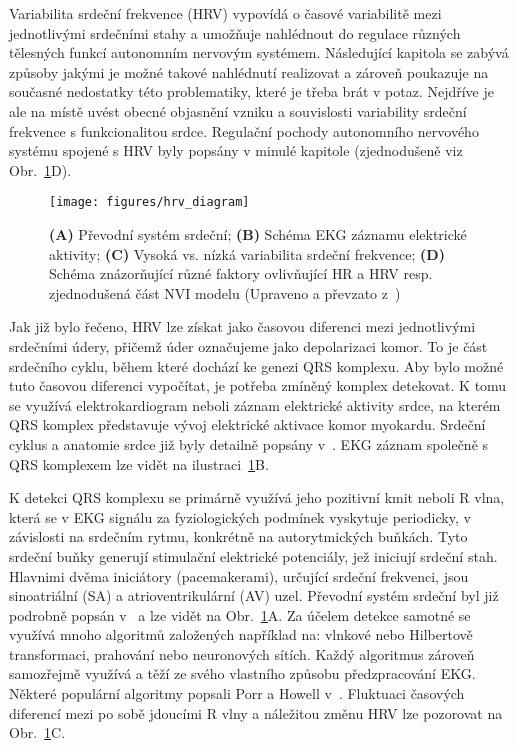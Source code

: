 Variabilita srdeční frekvence (\gls{HRV}) vypovídá o časové variabilitě mezi
jednotlivými srdečními stahy a umožňuje nahlédnout do regulace různých tělesných
funkcí autonomním nervovým systémem. Následující kapitola se zabývá způsoby
jakými je možné takové nahlédnutí realizovat a zároveň poukazuje na současné
nedostatky této problematiky, které je třeba brát v potaz. Nejdříve je ale na
místě uvést obecné objasnění vzniku a souvislosti variability srdeční frekvence
s funkcionalitou srdce. Regulační pochody autonomního nervového systému spojené
s \gls{HRV} byly popsány v minulé kapitole (zjednodušeně viz
Obr.~\ref{fig:hrv_diagram}D).

\begin{figure}[h]
    \begin{center}
        \texttt{[image: figures/hrv\_diagram]}
        \caption{\textbf{(A)} Převodní systém srdeční; \textbf{(B)} Schéma
            \gls{EKG} záznamu elektrické aktivity; \textbf{(C)} Vysoká vs. nízká
            variabilita srdeční frekvence; \textbf{(D)} Schéma znázorňující
            různé faktory ovlivňující \gls{HR} a \gls{HRV} resp. zjednodušená
            část \gls{NVI} modelu (Upraveno a převzato z~\cite{Lujan2021})}
        \label{fig:hrv_diagram}
    \end{center}
\end{figure}

Jak již bylo řečeno, \gls{HRV} lze získat jako časovou diferenci mezi jednotlivými
srdečními údery, přičemž úder označujeme jako depolarizaci komor. To je část
srdečního cyklu, během které dochází ke genezi QRS komplexu. Aby bylo možné tuto
časovou diferenci vypočítat, je potřeba zmíněný komplex detekovat. K tomu se
využívá elektrokardiogram neboli záznam elektrické aktivity srdce, na kterém QRS
komplex představuje vývoj elektrické aktivace komor myokardu. Srdeční cyklus a
anatomie srdce již byly detailně popsány v~\cite{Stejfa2006,Weinhaus2005,Cihak2016}.
EKG záznam společně s QRS komplexem lze vidět na ilustraci~\ref{fig:hrv_diagram}B.

K detekci QRS komplexu se primárně využívá jeho pozitivní kmit neboli R vlna,
která se v \gls{EKG} signálu za fyziologických podmínek vyskytuje periodicky, v
závislosti na srdečním rytmu, konkrétně na autorytmických buňkách. Tyto srdeční
buňky generují stimulační elektrické potenciály, jež iniciují srdeční stah.
Hlavnimi dvěma iniciátory (pacemakerami), určující srdeční frekvenci, jsou
sinoatriální (\gls{SA}) a atrioventrikulární (\gls{AV}) uzel. Převodní systém
srdeční byl již podrobně popsán v~\cite{Stejfa2006,Weinhaus2005,Goldberger2017}
a lze vidět na Obr.~\ref{fig:hrv_diagram}A. Za účelem detekce samotné se využívá
mnoho algoritmů založených například na: vlnkové nebo Hilbertově transformaci,
prahování nebo neuronových sítích. Každý algoritmus zároveň samozřejmě využívá a
těží ze svého vlastního způsobu předzpracování EKG. Některé populární algoritmy
popsali Porr a Howell v~\cite{Porr2019}. Fluktuaci časových diferencí mezi po
sobě jdoucími R vlny a náležitou změnu HRV lze pozorovat na
Obr.~\ref{fig:hrv_diagram}C.

